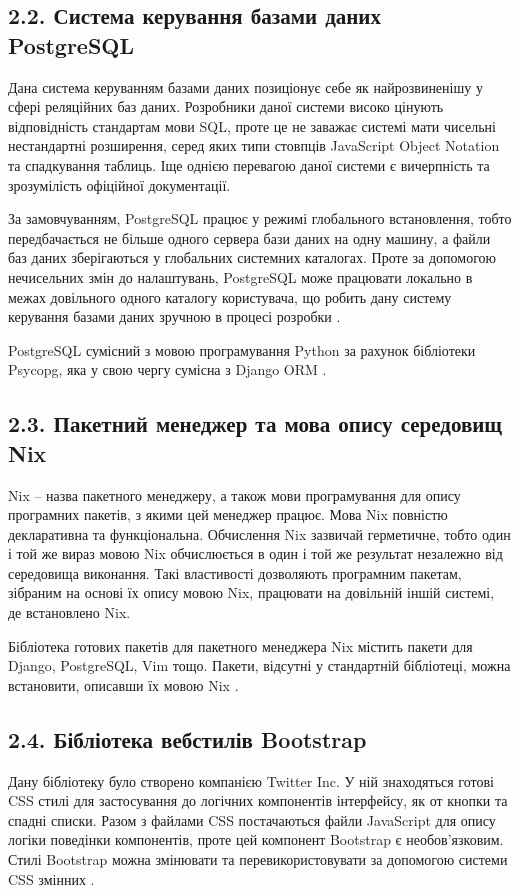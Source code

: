 \documentclass[a4paper, 14pt]{extarticle}
\begin{document}
  \subsection{2.2. Система керування базами даних PostgreSQL}
  Дана система керуванням базами даних позиціонує себе як найрозвиненішу у сфері
  реляційних баз даних. Розробники даної системи високо цінують відповідність стандартам
  мови SQL, проте це не заважає системі мати чисельні нестандартні розширення,
  серед яких типи стовпців JavaScript Object Notation та спадкування таблиць. Іще однією
  перевагою даної системи є вичерпність та зрозумілість офіційної документації.

  За замовчуванням, PostgreSQL працює у режимі глобального встановлення, тобто передбачається
  не більше одного сервера бази даних на одну машину, а файли баз даних зберігаються
  у глобальних системних каталогах. Проте за допомогою нечисельних змін до
  налаштувань, PostgreSQL може працювати локально в межах довільного одного каталогу
  користувача, що робить дану систему керування базами даних зручною в процесі
  розробки \cite{postgres}.

  PostgreSQL сумісний з мовою програмування Python за рахунок бібліотеки Psycopg,
  яка у свою чергу сумісна з Django ORM \cite{psycopg} \cite{django}.

  \subsection{2.3. Пакетний менеджер та мова опису середовищ Nix}
  Nix -- назва пакетного менеджеру, а також мови програмування для опису програмних
  пакетів, з якими цей менеджер працює. Мова Nix повністю декларативна та функціональна.
  Обчислення Nix зазвичай герметичне, тобто один і той же вираз мовою Nix обчислюється в один
  і той же результат незалежно від середовища виконання. Такі властивості дозволяють
  програмним пакетам, зібраним на основі їх опису мовою Nix, працювати на довільній іншій
  системі, де встановлено Nix.

  Бібліотека готових пакетів для пакетного менеджера Nix містить пакети для
  Django, PostgreSQL, Vim тощо. Пакети, відсутні у стандартній бібліотеці, можна
  встановити, описавши їх мовою Nix \cite{nixos}.

  \subsection{2.4. Бібліотека вебстилів Bootstrap}
  Дану бібліотеку було створено компанією Twitter Inc. У ній знаходяться готові
  CSS стилі для застосування до логічних компонентів інтерфейсу, як от
  кнопки та спадні списки. Разом з файлами CSS постачаються файли JavaScript для
  опису логіки поведінки компонентів, проте цей компонент Bootstrap є необов'язковим.
  Стилі Bootstrap можна змінювати та перевикористовувати за допомогою системи CSS змінних
  \cite{bs}.
\end{document}
